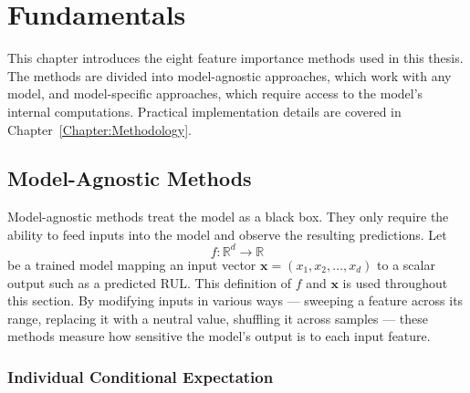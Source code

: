 \cleardoublepage

\chapter{Fundamentals}

This chapter introduces the eight feature importance methods used in this thesis. The methods are divided into model-agnostic approaches, which work with any model, and model-specific approaches, which require access to the model's internal computations. Practical implementation details are covered in Chapter~\ref{Chapter:Methodology}.

\section{Model-Agnostic Methods}

Model-agnostic methods treat the model as a black box. They only require the ability to feed inputs into the model and observe the resulting predictions. Let
%
\begin{equation}
    f: \mathbb{R}^d \to \mathbb{R}
    \label{eq:model}
\end{equation}
%
be a trained model mapping an input vector $\mathbf{x} = (x_1, x_2, \ldots, x_d)$ to a scalar output such as a predicted RUL. This definition of $f$ and $\mathbf{x}$ is used throughout this section. By modifying inputs in various ways — sweeping a feature across its range, replacing it with a neutral value, shuffling it across samples — these methods measure how sensitive the model's output is to each input feature.

\subsection{Individual Conditional Expectation}

